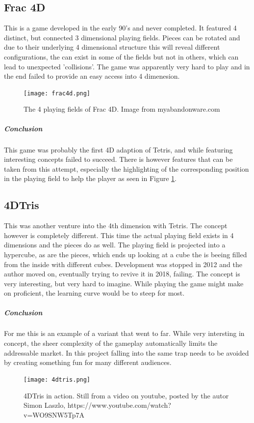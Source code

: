 \documentclass{article}
\begin{document}
\subsection{Frac 4D}
This is a game developed in the early 90's and never completed. It featured 4 distinct, but connected 3 dimensional playing fields. Pieces can be rotated and due to their underlying 4 dimensional structure this will reveal different configurations, the can exist in some of the fields but not in others, which can lead to unexpected 'collisions'. The game was apparently very hard to play and in the end failed to provide an easy access into 4 dimenesion.
\begin{figure}
    \label{fig:frac4d}
    \centering
    \texttt{[image: frac4d.png]}
    \caption{The 4 playing fields of Frac 4D. Image from myabandonware.com}
\end{figure}

\subparagraph*{Conclusion}
This game was probably the first 4D adaption of Tetris, and while featuring interesting concepts failed to succeed. There is however features that can be taken from this attempt, especially the highlighting of the corresponding position in the playing field to help the player as seen in Figure \ref{fig:frac4d}.
\subsection{4DTris}
This was another venture into the 4th dimension with Tetris. The concept however is completely different. This time the actual playing field exists in 4 dimensions and the pieces do as well. The playing field is projected into a hypercube, as are the pieces, which ends up looking at a cube the is beeing filled from the inside with different cubes. Development was stopped in 2012 and the author moved on, eventually trying to revive it in 2018, failing. The concept is very interesting, but very hard to imagine. While playing the game might make on proficient, the learning curve would be to steep for most.
\subparagraph*{Conclusion}
For me this is an example of a variant that went to far. While very intersting in concept, the sheer complexity of the gameplay automatically limits the addressable market. In this project falling into the same trap needs to be avoided by creating something fun for many different audiences.
\begin{figure}
    \label{fig:4dtris}
    \centering
    \texttt{[image: 4dtris.png]}
    \caption{4DTris in action. Still from a video on youtube, posted by the autor Simon Laszlo, https://www.youtube.com/watch?v=WO9SNW5Tp7A}
\end{figure}
\end{document}
